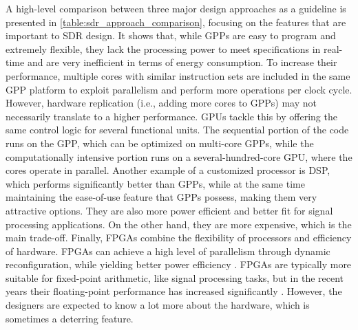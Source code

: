 A high-level comparison between three major design approaches as a guideline is presented in \autoref{table:sdr_approach_comparison}, focusing on the features that are important to SDR design. It shows that, while GPPs are easy to program and extremely flexible, they lack the processing power to meet specifications in real-time and are very inefficient in terms of energy consumption. To increase their performance, multiple cores with similar instruction sets are included in the same GPP platform to exploit parallelism and perform more operations per clock cycle. However, hardware replication (i.e., adding more cores to GPPs) may not necessarily translate to a higher performance. GPUs tackle this by offering the same control logic for several functional units. The sequential portion of the code runs on the GPP, which can be optimized on multi-core GPPs, while the computationally intensive portion runs on a several-hundred-core GPU, where the cores operate in parallel. Another example of a customized processor is DSP, which performs significantly better than GPPs, while at the same time maintaining the ease-of-use feature that GPPs possess, making them very attractive options. They are also more power efficient and better fit for signal processing applications. On the other hand, they are more expensive, which is the main trade-off. Finally, FPGAs combine the flexibility of processors and efficiency of hardware. FPGAs can achieve a high level of parallelism through dynamic reconfiguration, while yielding better power efficiency \cite{v2014a}. FPGAs are typically more suitable for fixed-point arithmetic, like signal processing tasks, but in the recent years their floating-point performance has increased significantly \cite{kestur2010a} \cite{underwood2004a}. However, the designers are expected to know a lot more about the hardware, which is sometimes a deterring feature.

